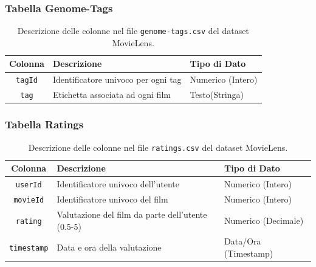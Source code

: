 \documentclass[a4paper,12pt]{article}
\begin{document}
        \subsubsection{Tabella Genome-Tags}
			\begin{table}[h!]
				\centering
					\begin{tabular}{|c|l|l|}
						\hline
						\textbf{Colonna} & \textbf{Descrizione} & \textbf{Tipo di Dato} \\ \hline
						\texttt{tagId} & Identificatore univoco per ogni tag & Numerico (Intero) \\ \hline
						\texttt{tag} & Etichetta associata ad ogni film & Testo(Stringa) \\ \hline
					\end{tabular}
				\caption{Descrizione delle colonne nel file \texttt{genome-tags.csv} del dataset MovieLens.}
			\end{table}

\newpage

        \subsubsection{Tabella Ratings}
			\begin{table}[h!]
				\centering
					\begin{tabular}{|c|l|l|}
						\hline
						\textbf{Colonna} & \textbf{Descrizione} & \textbf{Tipo di Dato} \\ \hline
						\texttt{userId} & Identificatore univoco dell'utente & Numerico (Intero) \\ \hline
						\texttt{movieId} & Identificatore univoco del film & Numerico (Intero) \\ \hline
						\texttt{rating} & Valutazione del film da parte dell'utente (0.5-5) & Numerico (Decimale) \\ \hline
						\texttt{timestamp} & Data e ora della valutazione & Data/Ora (Timestamp) \\ \hline
					\end{tabular}
				\caption{Descrizione delle colonne nel file \texttt{ratings.csv} del dataset MovieLens.}
			\end{table}
\end{document}

